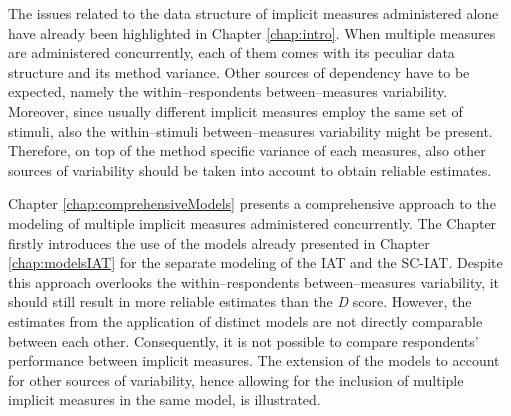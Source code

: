 \documentclass[12pt]{book}
\begin{document}
The issues related to the data structure of implicit measures administered alone have already been highlighted in Chapter \ref{chap:intro}. When multiple measures are administered concurrently, each of them comes with its peculiar data structure and its method variance. 
Other sources of dependency have to be expected, namely the within--respondents between--measures variability. Moreover, since usually different implicit measures employ the same set of stimuli, also the within--stimuli between--measures variability might be present.
Therefore, on top of the method specific variance of each measures, also other sources of variability should be taken into account to obtain reliable estimates.  

Chapter \ref{chap:comprehensiveModels} presents a comprehensive approach to the modeling of multiple implicit measures administered concurrently. The Chapter firstly introduces the use of the models already presented in Chapter \ref{chap:modelsIAT} for the separate modeling of the IAT and the SC-IAT. Despite this approach overlooks the within--respondents between--measures variability, it should still result in more reliable estimates than the \emph{D} score.
However, the estimates from the application of distinct models are not directly comparable between each other. Consequently, it is not possible to compare respondents' performance between implicit measures. 
The extension of the models to account for other sources of variability, hence allowing for the inclusion of multiple implicit measures in the same model, is illustrated. 
\end{document}
